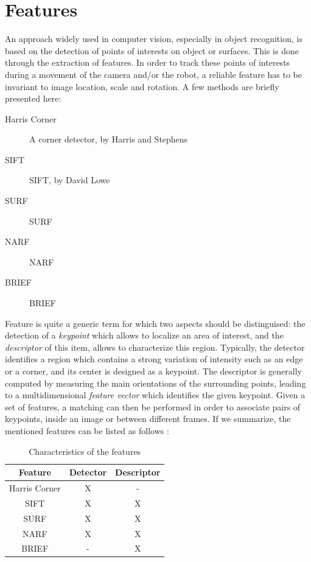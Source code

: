 \section{Features}

An approach widely used in computer vision, especially in object recognition, is based on the detection of points of interests on object or surfaces. This is done through the extraction of features. In order to track these points of interests during a movement of the camera and/or the robot, a reliable feature has to be invariant to image location, scale and rotation. A few methods are briefly presented here:

\begin{description}
\item[Harris Corner] A corner detector, by Harris and Stephens~\cite{Harris88alvey}
\item[SIFT] \gls{SIFT}, by David Lowe~\cite{lowe_2004_sift} 
\item[SURF] \gls{SURF}~\cite{surf}
\item[NARF] \gls{NARF}~\cite{steder10irosws}
\item[BRIEF] \gls{BRIEF}~\cite{Calonder10-brief}
\end{description}

Feature is quite a generic term for which two aspects should be distinguised: the detection of a \emph{keypoint} which allows to localize an area of interest, and the \emph{descriptor} of this item, allows to characterize this region. Typically, the detector identifies a region which contains a strong variation of intensity such as an edge or a corner, and its center is designed as a keypoint. The descriptor is generally computed by measuring the main orientations of the surrounding points, leading to a multidimensional \emph{feature vector} which identifies the given keypoint. Given a set of features, a matching can then be performed in order to associate pairs of keypoints, inside an image or between different frames. If we summarize, the mentioned features can be listed as follows :

\begin {table}
 \begin{center}
  \begin{tabular}{c|cc}
  \hline
  Feature & Detector & Descriptor \\
  \hline
  Harris Corner & X & - \\
  SIFT & X & X \\
  SURF & X & X \\
  NARF & X & X \\
  BRIEF & - & X \\
  \hline
  \end{tabular}
 \end{center}
\caption {Characteristics of the features}
\end{table}

